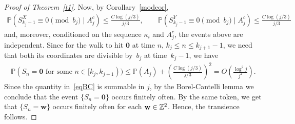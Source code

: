 \documentclass[10pt,a4paper]{amsart}
\renewcommand\P{\mathbb{P}}
\newcommand\Z{\mathbb{Z}}
\begin{document}
\begin{proof}[Proof of Theorem~\ref{t1}]
Now, by Corollary~\ref{modcor},
\begin{align*}
\P(S^X_{k_j-1}\equiv 0\pmod {b_j} \mid A_j^c)\le \frac{C\log (j/3)}{j/3},\qquad
\P(S^Y_{k_j-1}\equiv 0\pmod {b_j} \mid A_j^c)\le \frac{C\log (j/3)}{j/3}
\end{align*}
and, moreover, conditioned on the sequence $\kappa_i$ and $A_j^c$, the events above are independent. Since for the walk to hit $\mathbf{0}$ at time $n$, $k_{j}\le n\le k_{j+1}-1$, we need that both its coordinates are divisible by~$b_j$ at time~$k_j-1$, we have
\begin{align}\label{eqBC}
\P(S_n=\mathbf{0}\text{ for some }n\in [k_j,k_{j+1}))
\le \P(A_j)+\left(\frac{C\log (j/3)}{j/3}\right)^2
=O\left(\frac{\log^2 j}{j^2}\right).
\end{align}
Since the quantity in~\eqref{eqBC} is summable in $j$, by the Borel-Cantelli lemma we conclude that the event $\{S_n=\mathbf{0}\}$ occurs finitely often. By the same token, we get that $\{S_n=\mathbf{w}\}$ occurs finitely often for each ${\bf w}\in \Z^2$. Hence, the transience follows.
\end{proof}
\end{document}
